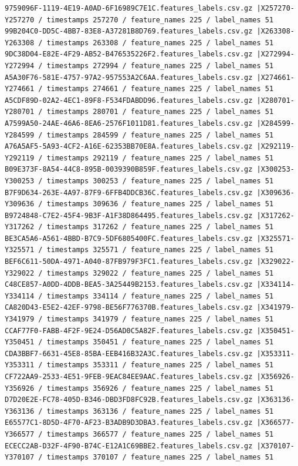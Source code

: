 \documentclass{UoNMCHA}
\numberwithin{equation}{section}
\begin{document}
\begin{lstlisting}[breaklines=true]
9759096F-1119-4E19-A0AD-6F16989C7E1C.features_labels.csv.gz |X257270-Y257270 / timestamps 257270 / feature_names 225 / label_names 51
99B204C0-DD5C-4BB7-83E8-A37281B8D769.features_labels.csv.gz |X263308-Y263308 / timestamps 263308 / feature_names 225 / label_names 51
9DC38D04-E82E-4F29-AB52-B476535226F2.features_labels.csv.gz |X272994-Y272994 / timestamps 272994 / feature_names 225 / label_names 51
A5A30F76-581E-4757-97A2-957553A2C6AA.features_labels.csv.gz |X274661-Y274661 / timestamps 274661 / feature_names 225 / label_names 51
A5CDF89D-02A2-4EC1-89F8-F534FDABDD96.features_labels.csv.gz |X280701-Y280701 / timestamps 280701 / feature_names 225 / label_names 51
A7599A50-24AE-46A6-8EA6-2576F1011D81.features_labels.csv.gz |X284599-Y284599 / timestamps 284599 / feature_names 225 / label_names 51
A76A5AF5-5A93-4CF2-A16E-62353BB70E8A.features_labels.csv.gz |X292119-Y292119 / timestamps 292119 / feature_names 225 / label_names 51
B09E373F-8A54-44C8-895B-0039390B859F.features_labels.csv.gz |X300253-Y300253 / timestamps 300253 / feature_names 225 / label_names 51
B7F9D634-263E-4A97-87F9-6FFB4DDCB36C.features_labels.csv.gz |X309636-Y309636 / timestamps 309636 / feature_names 225 / label_names 51
B9724848-C7E2-45F4-9B3F-A1F38D864495.features_labels.csv.gz |X317262-Y317262 / timestamps 317262 / feature_names 225 / label_names 51
BE3CA5A6-A561-4BBD-B7C9-5DF6805400FC.features_labels.csv.gz |X325571-Y325571 / timestamps 325571 / feature_names 225 / label_names 51
BEF6C611-50DA-4971-A040-87FB979F3FC1.features_labels.csv.gz |X329022-Y329022 / timestamps 329022 / feature_names 225 / label_names 51
C48CE857-A0DD-4DDB-BEA5-3A25449B2153.features_labels.csv.gz |X334114-Y334114 / timestamps 334114 / feature_names 225 / label_names 51
CA820D43-E5E2-42EF-9798-BE56F776370B.features_labels.csv.gz |X341979-Y341979 / timestamps 341979 / feature_names 225 / label_names 51
CCAF77F0-FABB-4F2F-9E24-D56AD0C5A82F.features_labels.csv.gz |X350451-Y350451 / timestamps 350451 / feature_names 225 / label_names 51
CDA3BBF7-6631-45E8-85BA-EEB416B32A3C.features_labels.csv.gz |X353311-Y353311 / timestamps 353311 / feature_names 225 / label_names 51
CF722AA9-2533-4E51-9FEB-9EAC84EE9AAC.features_labels.csv.gz |X356926-Y356926 / timestamps 356926 / feature_names 225 / label_names 51
D7D20E2E-FC78-405D-B346-DBD3FD8FC92B.features_labels.csv.gz |X363136-Y363136 / timestamps 363136 / feature_names 225 / label_names 51
E65577C1-8D5D-4F70-AF23-B3ADB9D3DBA3.features_labels.csv.gz |X366577-Y366577 / timestamps 366577 / feature_names 225 / label_names 51
ECECC2AB-D32F-4F90-B74C-E12A1C69BBE2.features_labels.csv.gz |X370107-Y370107 / timestamps 370107 / feature_names 225 / label_names 51

\end{lstlisting}
\end{document}

